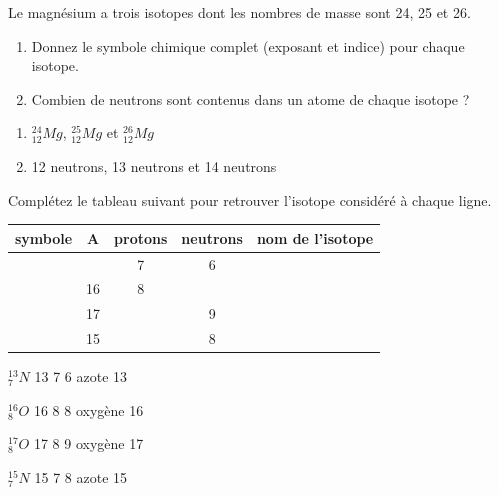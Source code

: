 \documentclass[
  11pt,
  a4paper,
  openany]{book}
\providecommand{\tightlist}{%
  \setlength{\itemsep}{0pt}\setlength{\parskip}{0pt}}
\begin{document}
\begin{Exercise}

Le magnésium a trois isotopes dont les nombres de masse sont 24, 25 et 26.

\begin{enumerate}
\def\labelenumi{\arabic{enumi}.}
\tightlist
\item
  Donnez le symbole chimique complet (exposant et indice) pour chaque isotope.\\
\item
  Combien de neutrons sont contenus dans un atome de chaque isotope ?\\
\end{enumerate}

\end{Exercise}

\begin{Answer}

\begin{enumerate}
\def\labelenumi{\arabic{enumi}.}
\tightlist
\item
  \(_{12}^{24}Mg\), \(_{12}^{25}Mg\) et \(_{12}^{26}Mg\)\\
\item
  12 neutrons, 13 neutrons et 14 neutrons
\end{enumerate}

\end{Answer}

\begin{Exercise}
Complétez le tableau suivant pour retrouver l'isotope considéré à chaque ligne.

\end{Exercise}

\begin{longtable}[]{@{}ccccc@{}}
\toprule\noalign{}
symbole & A & protons & neutrons & nom de l'isotope \\
\midrule\noalign{}
\endhead
\bottomrule\noalign{}
\endlastfoot
& & 7 & 6 & \\
& 16 & 8 & & \\
& 17 & & 9 & \\
& 15 & & 8 & \\
\end{longtable}

\begin{Answer}

\(_{7}^{13}N\) \textbar{} 13 \textbar{} 7 \textbar{} 6 \textbar{} azote 13

\(_{8}^{16}O\) \textbar{} 16 \textbar{} 8 \textbar{} 8 \textbar{} oxygène 16

\(_{8}^{17}O\) \textbar{} 17 \textbar{} 8 \textbar{} 9 \textbar{} oxygène 17

\(_{7}^{15}N\) \textbar{} 15 \textbar{} 7 \textbar{} 8 \textbar{} azote 15

\newpage

\end{Answer}
\end{document}
